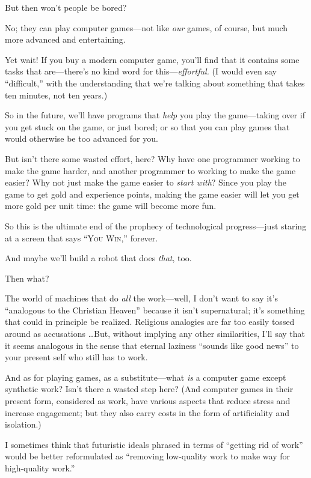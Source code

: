 {
 But then won't people be bored?}

{
 No; they can play computer games---not like \textit{our} games, of
course, but much more advanced and entertaining.}

{
 Yet wait! If you buy a modern computer game,
you'll find that it contains some tasks that
are---there's no kind word for
this---\textit{effortful.} (I would even say
``difficult,'' with the
understanding that we're talking about something that
takes ten minutes, not ten years.)}

{
 So in the future, we'll have programs that
\textit{help} you play the game---taking over if you get stuck on the
game, or just bored; or so that you can play games that would otherwise
be too advanced for you.}

{
 But isn't there some wasted effort, here? Why have
one programmer working to make the game harder, and another programmer
to working to make the game easier? Why not just make the game easier
to \textit{start with}? Since you play the game to get gold and
experience points, making the game easier will let you get more gold
per unit time: the game will become more fun.}

{
 So this is the ultimate end of the prophecy of technological
progress---just staring at a screen that says ``\textsc{You
Win},'' forever.}

{
 And maybe we'll build a robot that does
\textit{that}, too.}

{
 Then what?}

{
 The world of machines that do \textit{all} the work---well, I
don't want to say it's
``analogous to the Christian
Heaven'' because it isn't
supernatural; it's something that could in principle be
realized. Religious analogies are far too easily tossed around as
accusations \ldots But, without implying any other similarities,
I'll say that it seems analogous in the sense that
eternal laziness ``sounds like good
news'' to your present self who still has to work.}

{
 And as for playing games, as a substitute---what \textit{is} a
computer game except synthetic work? Isn't there a
wasted step here? (And computer games in their present form, considered
as work, have various aspects that reduce stress and increase
engagement; but they also carry costs in the form of artificiality and
isolation.)}

{
 I sometimes think that futuristic ideals phrased in terms of
``getting rid of work'' would be
better reformulated as ``removing low-quality work to
make way for high-quality work.''}

